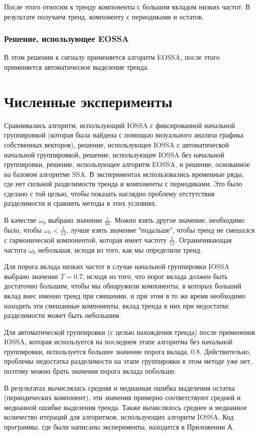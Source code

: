 \documentclass[specialist, substylefile = spbureport.rtx, subf,href,colorlinks=true, 12pt]{disser}
\theoremstyle{definition}
\begin{document}
После этого относим к тренду компоненты с большим вкладом низких
частот. В результате получаем тренд, компоненту с периодиками и остаток.

\subsection{Решение, использующее EOSSA}
В этом решении к сигналу применяется алгоритм EOSSA, после этого применяется автоматическое выделение тренда.

\chapter{Численные эксперименты}
Сравнивались алгоритм, использующий IOSSA с фиксированной начальной группировкой (которая была найдена с помощью визуального анализа графика собственных векторов),
решение, использующее IOSSA с автоматической начальной группировкой, решение, использующее IOSSA без начальной группировки, решение, использующее алгоритм EOSSA, и решение, основанное на базовом алгоритме SSA. В экспериментах использовались временные ряды, где нет сильной разделимости тренда и компоненты с периодиками. Это было сделано с той целью, чтобы показать наглядно проблему отстутствия разделимости и сравнить методы в этих условиях.

В качестве $\omega_0$ выбрано значение $\frac{1}{24}$. Можно взять другое значение, необходимо было, чтобы $\omega_0 < \frac{1}{12}$, лучше взять значение "подальше", чтобы тренд не смешался с гармонической компонентой, которая имеет частоту $\frac{1}{12}$. Ограничивающая частота $\omega_0$ небольшая, исходя из того, как мы определили тренд.

Для порога вклада низких частот в случае начальной группировки IOSSA выбрано значение $T = 0.7$, исходя из того, что порог вклада должен быть достаточно большим, чтобы мы обнаружили компоненты, в которых больший вклад внес именно тренд при смешении, и при этом в то же время необходимо находить эти смешанные компоненты, вклад тренда в них при недостатке разделимости может быть небольшим.

Для автоматической группировки (с целью нахождения тренда) после применения IOSSA, которая используется на последнем этапе алгоритма без начальной группировки, используется большее значение порога вклада, $0.8$. Действительно, проблемы недостатка разделимости на этапе группировки в этом методе уже нет, поэтому можно брать значения порога вклада побольше.

В результатах вычислялась средняя и медианная ошибка выделения остатка (периодических компонент), эти значения примерно соответствуют средней и медианной ошибке выделения тренда. Также вычислялось среднее и медианное количество итераций для алгоритмов, использующих алгоритм IOSSA.
Код программы, где были написаны эксперименты, находится в Приложении А.
\end{document}
